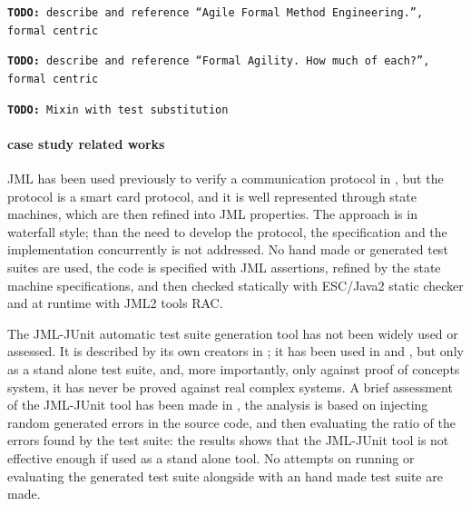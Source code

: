 \documentclass[english]{lni}
\newcommand{\todo}[1]{\texttt{\textbf{TODO:} #1}}
\begin{document}
\todo{describe and reference ``Agile Formal Method Engineering.'', formal centric}

\todo{describe and reference ``Formal Agility. How much of each?'', formal centric}

\todo{Mixin with test substitution}

\paragraph*{case study related works}

JML has been used previously to verify a communication protocol in \cite{Hubbers2004}, but the protocol is a smart card protocol, and it
is well represented through state machines, which are then refined into JML properties.  
The approach is in waterfall style; than the need to develop the protocol, the specification and the implementation concurrently is not addressed.  
No hand made or generated test suites are used, the code is specified with JML assertions, refined by the state machine specifications, and then checked statically with ESC/Java2 static checker\cite{CokKiniry04} and at runtime with JML2 tools RAC\cite{BurdyEtal05-STTT}.

The JML-JUnit automatic test suite generation tool has not been widely used or assessed. 
It is described by its own creators in \cite{Cheon2002,Cheon2004,Cheon2005}; it has been used in \cite{Oriat2004} and \cite{Cheon2005}, but only as a stand alone test suite, and, more importantly, only against proof of concepts system, it has never be proved against real complex systems.  
A brief assessment of the JML-JUnit tool has been made in \cite{Tan2004}, the analysis is based on injecting random generated errors in the source code, and then evaluating the ratio of the errors found by the test suite: the results shows that the JML-JUnit tool is not effective enough if used as a stand alone tool. 
No attempts on running or evaluating the generated test suite alongside with an hand made test suite are made.
\end{document}
